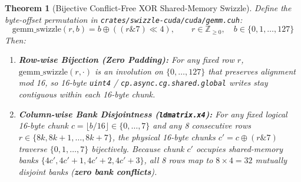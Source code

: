 \documentclass[10pt,a4paper]{article}
\theoremstyle{swzstyle}
\newtheorem{theorem}{Theorem}[section]
\newcommand{\code}[1]{\texttt{#1}}
\begin{document}
\begin{theorem}[Bijective Conflict-Free XOR Shared-Memory Swizzle]
Define the byte-offset permutation in \code{crates/swizzle-cuda/cuda/gemm.cuh}:
\begin{equation}
  \text{gemm\_swizzle}(r, b) = b \oplus \left((r \mathbin{\&} 7) \ll 4\right), \qquad r \in \mathbb{Z}_{\ge 0},\quad b \in \{0, 1, \dots, 127\}
  \label{eq:gemm_swizzle}
\end{equation}
Then:
\begin{enumerate}
  \item \textbf{Row-wise Bijection (Zero Padding):} For any fixed row $r$, $\text{gemm\_swizzle}(r, \cdot)$ is an involution on $\{0, \dots, 127\}$ that preserves alignment mod 16, so 16-byte \code{uint4} / \code{cp.async.cg.shared.global} writes stay contiguous within each 16-byte chunk.
  \item \textbf{Column-wise Bank Disjointness (\texttt{ldmatrix.x4}):} For any fixed logical 16-byte chunk $c = \lfloor b/16 \rfloor \in \{0, \dots, 7\}$ and any 8 consecutive rows $r \in \{8k, 8k+1, \dots, 8k+7\}$, the physical 16-byte chunks $c' = c \oplus (r \mathbin{\&} 7)$ traverse $\{0, 1, \dots, 7\}$ bijectively. Because chunk $c'$ occupies shared-memory banks $\{4c', 4c'+1, 4c'+2, 4c'+3\}$, all 8 rows map to $8 \times 4 = 32$ mutually disjoint banks (\textbf{zero bank conflicts}).
\end{enumerate}
\end{theorem}
\end{document}
